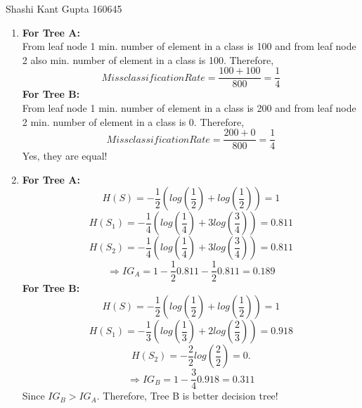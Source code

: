 \documentclass[a4paper,11pt]{article}
\begin{document}
{Shashi Kant Gupta}   %
{160645}	%

\begin{mlsolution}

  \begin{enumerate}
    \item
      \textbf{For Tree A:} \\
        From leaf node 1 min. number of element in a class is 100 and from leaf node 2 also min. number of element in a class is 100. Therefore,
        \begin{equation}
          MissclassificationRate = \frac{100 + 100}{800} = \frac{1}{4}
        \end{equation}
      \textbf{For Tree B:} \\
        From leaf node 1 min. number of element in a class is 200 and from leaf node 2 min. number of element in a class is 0. Therefore,
        \begin{equation}
          MissclassificationRate = \frac{200 + 0}{800} = \frac{1}{4}
        \end{equation}
        Yes, they are equal!
    \item
      \textbf{For Tree A:}
      {\begin{equation}
        H(S) = -\frac{1}{2}(log(\frac{1}{2}) + log(\frac{1}{2}))
             = 1
      \end{equation}}
      \begin{equation}
        H(S_{1}) = -\frac{1}{4}(log(\frac{1}{4}) + 3log(\frac{3}{4}))
                 = 0.811
      \end{equation}
      \begin{equation}
        H(S_{2}) = -\frac{1}{4}(log(\frac{1}{4}) + 3log(\frac{3}{4}))
                 = 0.811
      \end{equation}
      \begin{equation}
        \Rightarrow IG_{A} = 1 - \frac{1}{2}0.811 - \frac{1}{2}0.811
                       = 0.189
      \end{equation}
      \textbf{For Tree B:}
      {\begin{equation}
        H(S) = -\frac{1}{2}(log(\frac{1}{2}) + log(\frac{1}{2}))
             = 1
      \end{equation}}
      \begin{equation}
        H(S_{1}) = -\frac{1}{3}(log(\frac{1}{3}) + 2log(\frac{2}{3}))
                 = 0.918
      \end{equation}
      \begin{equation}
        H(S_{2}) = -\frac{2}{2}log(\frac{2}{2})
                 = 0.
      \end{equation}
      \begin{equation}
        \Rightarrow IG_{B} = 1 - \frac{3}{4}0.918
                       = 0.311
      \end{equation}
      Since $IG_{B} > IG_{A}$. Therefore, Tree B is better decision tree!


\end{enumerate}
\end{mlsolution}
\end{document}
